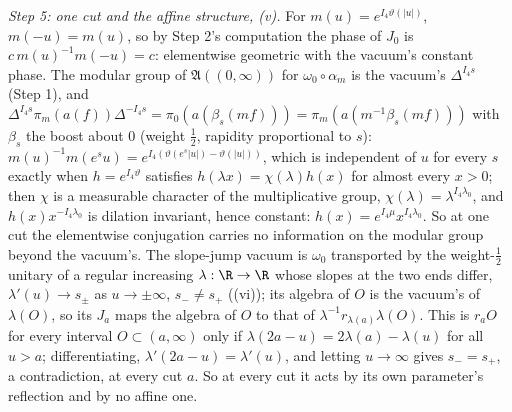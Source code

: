 \emph{Step 5: one cut and the affine structure, (v).} For $m(u) = e^{I_{4}\vartheta(|u|)}$, $m(-u) = m(u)$, so by Step 2's computation the phase of $J_{0}$ is $c\,m(u)^{-1}m(-u) = c$: elementwise geometric with the vacuum's constant phase. The modular group of $\mathfrak{A}((0, \infty))$ for $\omega_{0}\circ\alpha_{m}$ is the vacuum's $\Delta^{I_{4}s}$ (Step 1), and $\Delta^{I_{4}s}\pi_{m}(a(f))\Delta^{-I_{4}s} = \pi_{0}(a(\beta_{s}(mf))) = \pi_{m}(a(m^{-1}\beta_{s}(mf)))$ with $\beta_{s}$ the boost about $0$ (weight $\tfrac12$, rapidity proportional to $s$): $m(u)^{-1}m(e^{s}u) = e^{I_{4}(\vartheta(e^{s}|u|) - \vartheta(|u|))}$, which is independent of $u$ for every $s$ exactly when $h = e^{I_{4}\vartheta}$ satisfies $h(\lambda x) = \chi(\lambda)h(x)$ for almost every $x > 0$; then $\chi$ is a measurable character of the multiplicative group, $\chi(\lambda) = \lambda^{I_{4}\lambda_{0}}$, and $h(x)x^{-I_{4}\lambda_{0}}$ is dilation invariant, hence constant: $h(x) = e^{I_{4}\mu}x^{I_{4}\lambda_{0}}$. So at one cut the elementwise conjugation carries no information on the modular group beyond the vacuum's. The slope-jump vacuum is $\omega_{0}$ transported by the weight-$\tfrac12$ unitary of a regular increasing $\lambda : \R \to \R$ whose slopes at the two ends differ, $\lambda'(u) \to s_{\pm}$ as $u \to \pm\infty$, $s_{-} \neq s_{+}$ ((vi)); its algebra of $O$ is the vacuum's of $\lambda(O)$, so its $J_{a}$ maps the algebra of $O$ to that of $\lambda^{-1}r_{\lambda(a)}\lambda(O)$. This is $r_{a}O$ for every interval $O \subset (a, \infty)$ only if $\lambda(2a - u) = 2\lambda(a) - \lambda(u)$ for all $u > a$; differentiating, $\lambda'(2a - u) = \lambda'(u)$, and letting $u \to \infty$ gives $s_{-} = s_{+}$, a contradiction, at every cut $a$. So at every cut it acts by its own parameter's reflection and by no affine one.

